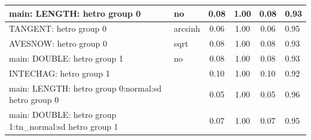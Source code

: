 \begin{table}
\begin{center}
\begin{tabular}{|l|l|c|c|c|l|}
			\hline
			main: LENGTH: hetro group 0 & no & 0.08 & 1.00 & 0.08 & 0.93 \\
			\hline
			TANGENT: hetro group 0 & arcsinh & 0.06 & 1.00 & 0.06 & 0.95 \\
			\hline
			AVESNOW: hetro group 0 & sqrt & 0.08 & 1.00 & 0.08 & 0.93 \\
			\hline
			main: DOUBLE: hetro group 1 & no & 0.08 & 1.00 & 0.08 & 0.93 \\
			\hline
			INTECHAG: hetro group 1 &  & 0.10 & 1.00 & 0.10 & 0.92 \\
			\hline
			main: LENGTH: hetro group 0:normal:sd  hetro group 0 &  & 0.05 & 1.00 & 0.05 & 0.96 \\
			\hline
			main: DOUBLE: hetro group 1:tn_normal:sd  hetro group 1 &  & 0.07 & 1.00 & 0.07 & 0.95 \\
			\hline
		\end{tabular}
	\end{center}
\end{table}